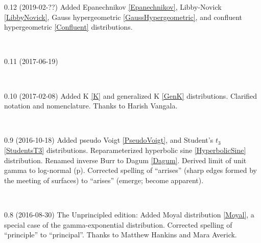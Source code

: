 {
\small \tightstretch

0.12 (2019-02-??) 
Added
Epanechnikov \eqref{Epanechnikov}, 
Libby-Novick \eqref{LibbyNovick},
Gauss hypergeometric \eqref{GaussHypergeometric},
and
confluent hypergeometric \eqref{Confluent}
distributions. 

~

0.11 (2017-06-19)

~

0.10 (2017-02-08)
Added K \eqref{K}  and generalized K  \eqref{GenK} distributions.
Clarified notation and nomenclature.
Thanks to Harish Vangala.

~

0.9 (2016-10-18)
Added 
	pseudo Voigt \eqref{PseudoVoigt}, 
and
	Student's $t_3$ \eqref{StudentsT3}
distributions.
Reparameterized hyperbolic sine \eqref{HyperbolicSine} distribution.
Renamed inverse Burr to Dagum \eqref{Dagum}. %
Derived limit of unit gamma to log-normal (p\pageref{UnitGammaToLogNormal}). 
Corrected spelling of  ``arrises'' (sharp edges formed by the meeting of surfaces) to ``arises'' (emerge; become apparent). 

~

0.8 (2016-08-30)
The Unprincipled edition:
Added Moyal distribution \eqref{Moyal}, a special case of the gamma-exponential distribution.
Corrected spelling of ``principle'' to ``principal''. Thanks to Matthew Hankins and Mara Averick.

~

}
